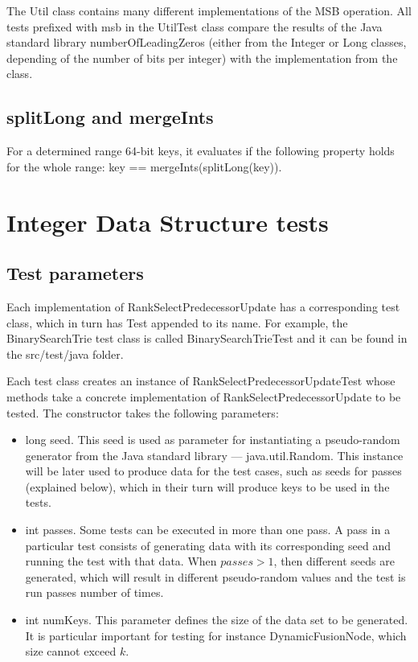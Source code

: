 The {\ttfamily Util} class contains many different implementations of the MSB operation. All tests prefixed with {\ttfamily msb} in the {\ttfamily UtilTest} class compare the results of the Java standard library {\ttfamily numberOfLeadingZeros} (either from the {\ttfamily Integer} or {\ttfamily Long} classes, depending of the number of bits per integer) with the implementation from the class.

\subsection{{\ttfamily splitLong} and {\ttfamily mergeInts}}

For a determined range 64-bit keys, it evaluates if the following property holds for the whole range: {\ttfamily key == mergeInts(splitLong(key))}.

\section{Integer Data Structure tests}

\subsection{Test parameters}

Each implementation of {\ttfamily RankSelectPredecessorUpdate} has a corresponding test class, which in turn has {\ttfamily Test} appended to its name. For example, the {\ttfamily BinarySearchTrie} test class is called {\ttfamily BinarySearchTrieTest} and it can be found in the {\ttfamily src/test/java} folder.

Each test class creates an instance of {\ttfamily RankSelectPredecessorUpdateTest} whose methods take a concrete implementation of {\ttfamily RankSelectPredecessorUpdate} to be tested. The constructor takes the following parameters:

\begin{itemize}
    \item {\ttfamily long seed}. This seed is used as parameter for instantiating a pseudo-random generator from the Java standard library --- {\ttfamily java.util.Random}. This instance will be later used to produce data for the test cases, such as seeds for passes (explained below), which in their turn will produce keys to be used in the tests.
    \item {\ttfamily int passes}. Some tests can be executed in more than one pass. A pass in a particular test consists of generating data with its corresponding seed and running the test with that data. When $passes > 1$, then different seeds are generated, which will result in different pseudo-random values and the test is run {\ttfamily passes} number of times.
    \item {\ttfamily int numKeys}. This parameter defines the size of the data set to be generated. It is particular important for testing for instance {\ttfamily DynamicFusionNode}, which size cannot exceed $k$.
\end{itemize}

